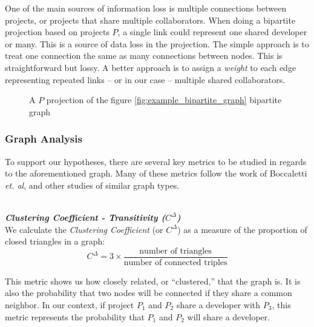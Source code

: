 \documentclass{proc}
\begin{document}
One of the main sources of information loss is multiple connections between projects, or projects that share multiple collaborators. When doing a bipartite projection based on projects $P$, a single link could represent one shared developer or many. This is a source of data loss in the projection. The simple approach is to treat one connection the same as many connections between nodes. This is straightforward but lossy\cite{zhou2007bipartite,grossman1995portion}. A better approach is to assign a \textit{weight} to each edge representing repeated links -- or in our case -- multiple shared collaborators\cite{zha2001bipartite,barrat2004architecture}.

\begin{figure}
\centering
{}
\caption{A $P$ projection of the figure \ref{fig:example_bipartite_graph} bipartite graph}
\label{fig:example_bipartite_projection_graph}
\end{figure}

\subsubsection{Graph Analysis}
To support our hypotheses, there are several key metrics to be studied in regards to the aforementioned graph. Many of these metrics follow the work of Boccaletti \textit{et. al}\cite{boccaletti2006complex}, and other studies of similar graph types\cite{latora2001efficient,adamic1999small}.

\noindent\\\textit{\textbf{Clustering Coefficient - Transitivity ($C^\Delta$)}}\\
We calculate the \textit{Clustering Coefficient} (or $C^\Delta$) as a measure of the proportion of closed triangles in a graph\cite{newman2003structure}:
\[C^\Delta = 3 \times \frac{\text{number of triangles}}
                    {\text{number of connected triples}}\]

This metric shows us how closely related, or ``clustered,'' that the graph is. It is also the probability that two nodes will be connected if they share a common neighbor\cite{newman2003properties}. In our context, if project $P_1$ and $P_2$ share a developer with $P_3$, this metric represents the probability that $P_1$ and $P_2$ will share a developer.
\end{document}
